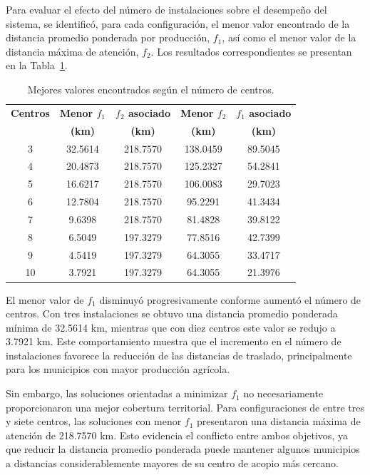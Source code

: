 \documentclass[journal]{IEEEtran}
\begin{document}
Para evaluar el efecto del número de instalaciones sobre el desempeño del sistema, se identificó, para cada configuración, el menor valor encontrado de la distancia promedio ponderada por producción, $f_1$, así como el menor valor de la distancia máxima de atención, $f_2$. Los resultados correspondientes se presentan en la Tabla~\ref{tab:resultados_tres_objetivos}.

\begin{table}[!t]
	\centering
	\caption{Mejores valores encontrados según el número de centros.}
	\label{tab:resultados_tres_objetivos}
	\begin{tabular}{ccccc}
		\toprule
		\textbf{Centros} &
		\textbf{Menor $f_1$} &
		\textbf{$f_2$ asociado} &
		\textbf{Menor $f_2$} &
		\textbf{$f_1$ asociado} \\
		& \textbf{(km)} & \textbf{(km)} & \textbf{(km)} & \textbf{(km)} \\
		\midrule
		3  & 32.5614 & 218.7570 & 138.0459 & 89.5045 \\
		4  & 20.4873 & 218.7570 & 125.2327 & 54.2841 \\
		5  & 16.6217 & 218.7570 & 106.0083 & 29.7023 \\
		6  & 12.7804 & 218.7570 & 95.2291  & 41.3434 \\
		7  & 9.6398  & 218.7570 & 81.4828  & 39.8122 \\
		8  & 6.5049  & 197.3279 & 77.8516  & 42.7399 \\
		9  & 4.5419  & 197.3279 & 64.3055  & 33.4717 \\
		10 & 3.7921  & 197.3279 & 64.3055  & 21.3976 \\
		\bottomrule
	\end{tabular}
\end{table}

El menor valor de $f_1$ disminuyó progresivamente conforme aumentó el número de centros. Con tres instalaciones se obtuvo una distancia promedio ponderada mínima de 32.5614 km, mientras que con diez centros este valor se redujo a 3.7921 km. Este comportamiento muestra que el incremento en el número de instalaciones favorece la reducción de las distancias de traslado, principalmente para los municipios con mayor producción agrícola.

Sin embargo, las soluciones orientadas a minimizar $f_1$ no necesariamente proporcionaron una mejor cobertura territorial. Para configuraciones de entre tres y siete centros, las soluciones con menor $f_1$ presentaron una distancia máxima de atención de 218.7570 km. Esto evidencia el conflicto entre ambos objetivos, ya que reducir la distancia promedio ponderada puede mantener algunos municipios a distancias considerablemente mayores de su centro de acopio más cercano.
\end{document}
